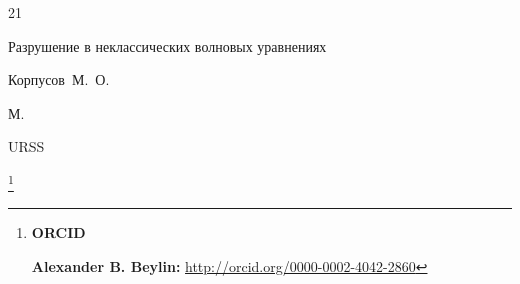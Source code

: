 \begin{thebibliography}{21}




\book Разрушение в неклассических волновых уравнениях

\by Корпусов~М.~О.

\publaddr М.

\publ URSS






\end{thebibliography}



\RuDate





\newpage



\makeentitle









\smallskip

\thanks{{\bf ORCID}



{\bf Alexander B. Beylin:} \url{http://orcid.org/0000-0002-4042-2860}



}



\EngRef







